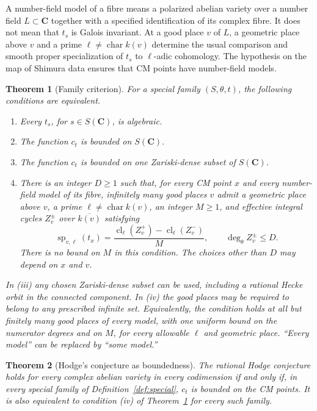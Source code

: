 \documentclass[11pt]{article}
\newtheorem{theorem}{Theorem}[section]
\theoremstyle{definition}
\theoremstyle{remark}
\newcommand{\C}{\mathbf C}
\newcommand{\cl}{\operatorname{cl}}
\begin{document}
A number-field model of a fibre means a polarized abelian variety over a number field $L\subset\C$ together with a specified identification of its complex fibre. It does not mean that $t_s$ is Galois invariant. At a good place $v$ of $L$, a geometric place above $v$ and a prime $\ell\ne\operatorname{char}k(v)$ determine the usual comparison and smooth proper specialization of $t_s$ to $\ell$-adic cohomology. The hypothesis on the map of Shimura data ensures that CM points have number-field models.

\begin{theorem}[Family criterion]\label{thm:family}
For a special family $(S,\theta,t)$, the following conditions are equivalent.
\begin{enumerate}[label=\textnormal{(\roman*)}]
\item Every $t_s$, for $s\in S(\C)$, is algebraic.
\item The function $c_t$ is bounded on $S(\C)$.
\item The function $c_t$ is bounded on one Zariski-dense subset of $S(\C)$.
\item There is an integer $D\geq1$ such that, for every CM point $x$ and every number-field model of its fibre, infinitely many good places $v$ admit a geometric place above $v$, a prime $\ell\ne\operatorname{char}k(v)$, an integer $M\geq1$, and effective integral cycles $Z_v^\pm$ over $\overline{k(v)}$ satisfying
\[
 \operatorname{sp}_{v,\ell}(t_x)
 =\frac{\cl_\ell(Z_v^+)-\cl_\ell(Z_v^-)}{M},
 \qquad \deg_\theta Z_v^\pm\leq D.
\]
There is no bound on $M$ in this condition. The choices other than $D$ may depend on $x$ and $v$.
\end{enumerate}
In \textnormal{(iii)} any chosen Zariski-dense subset can be used, including a rational Hecke orbit in the connected component. In \textnormal{(iv)} the good places may be required to belong to any prescribed infinite set. Equivalently, the condition holds at all but finitely many good places of every model, with one uniform bound on the numerator degrees and on $M$, for every allowable $\ell$ and geometric place. ``Every model'' can be replaced by ``some model.''
\end{theorem}

\begin{theorem}[Hodge's conjecture as boundedness]\label{thm:global}
The rational Hodge conjecture holds for every complex abelian variety in every codimension if and only if, in every special family of Definition~\ref{def:special}, $c_t$ is bounded on the CM points. It is also equivalent to condition \textnormal{(iv)} of Theorem~\ref{thm:family} for every such family.
\end{theorem}
\end{document}
